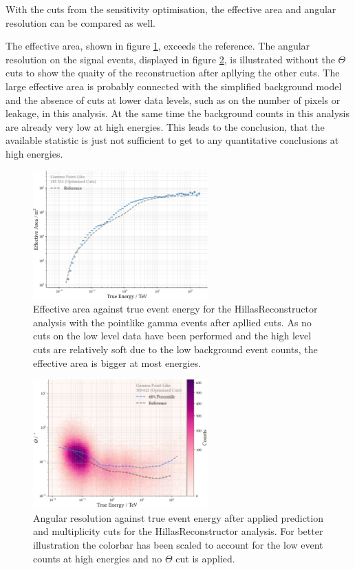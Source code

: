 With the cuts from the sensitivity optimisation, the effective area and angular resolution can be
compared as well.

The effective area, shown in figure \ref{fig:hillas_area}, exceeds the reference.
The angular resolution on the signal events, displayed in figure \ref{fig:hillas_resol}, is illustrated without
the $\Theta$ cuts to show the quaity of the reconstruction after apllying the
other cuts.
The large effective area is probably connected with the simplified background model
and the absence of cuts at lower data levels, such as on the number of pixels or
leakage, in this analysis.
At the same time the background counts in this analysis are already very low at high energies.
This leads to the conclusion, that the available statistic is just not sufficient
to get to any quantitative conclusions at high energies.

\begin{figure}
    \centering
    \captionsetup{width=0.9\linewidth}
    \includegraphics[width=0.6\textwidth]{../analysis/plots/sensitivity/hillas_effective_area.pdf} 
    \caption{Effective area against true event energy for the HillasReconstructor analysis
    with the pointlike gamma events after apllied cuts.
    As no cuts on the low level data have been performed and the high level cuts are relatively
    soft due to the low background event counts, the effective area is bigger at most energies.}
    \label{fig:hillas_area}
\end{figure}

\begin{figure}
    \centering
    \captionsetup{width=0.9\linewidth}
    \includegraphics[width=0.6\textwidth]{../analysis/plots/sensitivity/hillas_resolution.pdf} 
    \caption{Angular resolution against true event energy after applied 
    prediction and multiplicity cuts for the HillasReconstructor analysis.
    For better illustration the colorbar has been scaled to account for the
    low event counts at high energies and no $\Theta$ cut is applied.}
    \label{fig:hillas_resol}
\end{figure}

